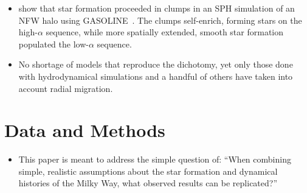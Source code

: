 \documentclass[a4paper, fleqn, usenatbib, useAMS]{mnras}
\begin{document}
\begin{itemize}
\begin{itemize}
		\item \citet{Clarke2019} show that star formation proceeded in clumps 
		in an SPH simulation of an NFW halo using GASOLINE~\citep{NFW1997, 
		Wadsley2017}. The clumps self-enrich, forming stars on the 
		high-$\alpha$ sequence, while more spatially extended, smooth star 
		formation populated the low-$\alpha$ sequence. 

		\item No shortage of models that reproduce the dichotomy, yet only 
		those done with hydrodynamical simulations and a handful of others 
		have taken into account radial migration. 
	\end{itemize} 

\end{itemize} 

\section{Data and Methods} 
\label{sec:methods} 

\begin{itemize} 
	\item This paper is meant to address the simple question of: ``When 
	combining simple, realistic assumptions about the star formation and 
	dynamical histories of the Milky Way, what observed results can be 
	replicated?'' 
\end{itemize} 
\end{document}
